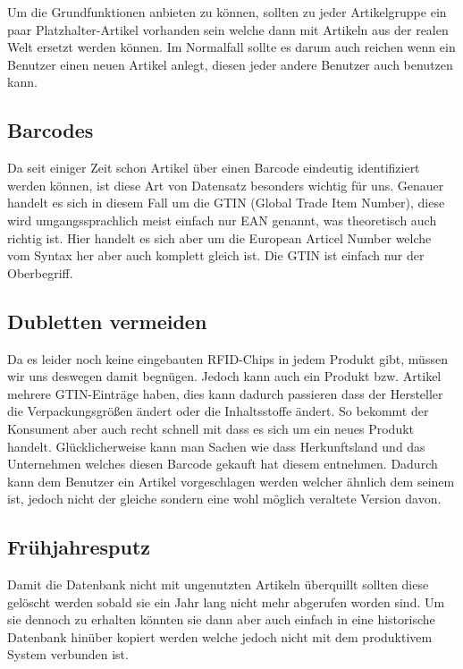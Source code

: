\documentclass{article}
\begin{document}
\begin{flushleft}

Um die Grundfunktionen anbieten zu können, sollten zu jeder Artikelgruppe ein paar Platzhalter-Artikel vorhanden sein welche dann mit Artikeln aus der realen Welt ersetzt werden können. Im Normalfall sollte es darum auch reichen wenn ein Benutzer einen neuen Artikel anlegt, diesen jeder andere Benutzer auch benutzen kann.

\subsection{Barcodes}

Da seit einiger Zeit schon Artikel über einen Barcode eindeutig identifiziert werden können, ist diese Art von Datensatz besonders wichtig für uns. Genauer handelt es sich in diesem Fall um die GTIN (Global Trade Item Number), diese wird umgangssprachlich meist einfach nur EAN genannt, was theoretisch auch richtig ist. Hier handelt es sich aber um die European Articel Number welche vom Syntax her aber auch komplett gleich ist. Die GTIN ist einfach nur der Oberbegriff.

\subsection{Dubletten vermeiden}

Da es leider noch keine eingebauten RFID-Chips in jedem Produkt gibt, müssen wir uns deswegen damit begnügen. Jedoch kann auch ein Produkt bzw. Artikel mehrere GTIN-Einträge haben, dies kann dadurch passieren dass der Hersteller die Verpackungsgrößen ändert oder die Inhaltsstoffe ändert. So bekommt der Konsument aber auch recht schnell mit dass es sich um ein neues Produkt handelt. Glücklicherweise kann man Sachen wie dass Herkunftsland und das Unternehmen welches diesen Barcode gekauft hat diesem entnehmen. Dadurch kann dem Benutzer ein Artikel vorgeschlagen werden welcher ähnlich dem seinem ist, jedoch nicht der gleiche sondern eine wohl möglich veraltete Version davon.

\subsection{Frühjahresputz}

Damit die Datenbank nicht mit ungenutzten Artikeln überquillt sollten diese gelöscht werden sobald sie ein Jahr lang nicht mehr abgerufen worden sind. Um sie dennoch zu erhalten könnten sie dann aber auch einfach in eine historische Datenbank hinüber kopiert werden welche jedoch nicht mit dem produktivem System verbunden ist.


\end{flushleft}
\end{document}
